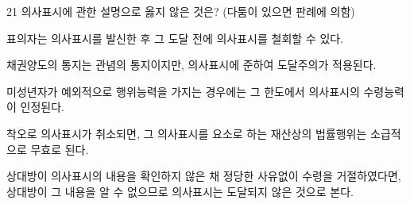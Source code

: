 \begin{question}{21}
의사표시에 관한 설명으로 옳지 않은 것은? (다툼이 있으면 판례에 의함)
\begin{choices}
  \item 표의자는 의사표시를 발신한 후 그 도달 전에 의사표시를 철회할 수 있다.
  \item 채권양도의 통지는 관념의 통지이지만, 의사표시에 준하여 도달주의가 적용된다.
  \item 미성년자가 예외적으로 행위능력을 가지는 경우에는 그 한도에서 의사표시의 수령능력이 인정된다.
  \item 착오로 의사표시가 취소되면, 그 의사표시를 요소로 하는 재산상의 법률행위는 소급적으로 무효로 된다.
  \item 상대방이 의사표시의 내용을 확인하지 않은 채 정당한 사유없이 수령을 거절하였다면, 상대방이 그 내용을 알 수 없으므로 의사표시는 도달되지 않은 것으로 본다.
\end{choices}
\end{question}
